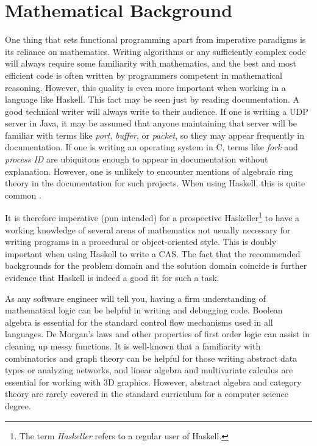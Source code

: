 \documentclass[MS, xcolor=dvipsnames]{wfuthesis}
\theoremstyle{definition}
\begin{document}
\chapter{Mathematical Background}
One thing that sets functional programming apart from imperative paradigms is its reliance on mathematics. Writing algorithms or any sufficiently complex code will always require some familiarity with mathematics, and the best and most efficient code is often written by programmers competent in mathematical reasoning. However, this quality is even more important when working in a language like Haskell. This fact may be seen just by reading documentation. A good technical writer will always write to their audience. If one is writing a UDP server in Java, it may be assumed that anyone maintaining that server will be familiar with terms like \textit{port}, \textit{buffer}, or \textit{packet}, so they may appear frequently in documentation. If one is writing an operating system in C, terms like \textit{fork} and \textit{process ID} are ubiquitous enough to appear in documentation without explanation. However, one is unlikely to encounter mentions of algebraic ring theory in the documentation for such projects. When using Haskell, this is quite common \cite{Prelude}. \par
It is therefore imperative (pun intended) for a prospective Haskeller\footnote{The term \textit{Haskeller} refers to a regular user of Haskell.} to have a working knowledge of several areas of mathematics not usually necessary for writing programs in a procedural or object-oriented style. This is doubly important when using Haskell to write a CAS. The fact that the recommended backgrounds for the problem domain and the solution domain coincide is further evidence that Haskell is indeed a good fit for such a task. \par
As any software engineer will tell you, having a firm understanding of mathematical logic can be helpful in writing and debugging code. Boolean algebra is essential for the standard control flow mechanisms used in all languages. De Morgan's laws and other properties of first order logic can assist in cleaning up messy functions. It is well-known that a familiarity with combinatorics and graph theory can be helpful for those writing abstract data types or analyzing networks, and linear algebra and multivariate calculus are essential for working with 3D graphics. However, abstract algebra and category theory are rarely covered in the standard curriculum for a computer science degree. \par
\end{document}
